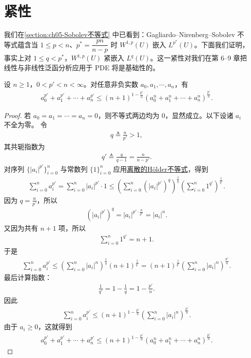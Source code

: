 \documentclass[../../main.tex]{subfiles}
\begin{document}
\section{紧性}\label{section:ch05-紧性}

我们在\cref{section:ch05-Sobolev不等式} 中已看到：Gagliardo--Nirenberg--Sobolev 不等式蕴含当 $1\leqslant p<n$、$p^{*}=\dfrac{pn}{n-p}$ 时 $W^{1,p}(U)$ 嵌入 $L^{p^{*}}(U)$。下面我们证明，事实上对 $1\leqslant q<p^{*}$，$W^{1,p}(U)$ 紧嵌入 $L^{q}(U)$。这一紧性对我们在第 6--9 章把线性与非线性泛函分析应用于 PDE 将是基础性的。

\begin{lemma}\label{lemma:有限维lp与ln范数}
设 $n\geqslant 1$，$0<p'<n<\infty$。对任意非负实数 $a_0,a_1,\cdots,a_n$，有
\begin{align*}
a_0^{p'}+a_1^{p'}+\cdots+a_n^{p'}
\leqslant (n+1)^{1-\frac{p'}{n}}
\left(a_0^{n}+a_1^{n}+\cdots+a_n^{n}\right)^{\frac{p'}{n}}.
\end{align*}
\end{lemma}
\begin{proof}
若 $a_0=a_1=\cdots=a_n=0$，则不等式两边均为 $0$，显然成立。以下设诸 $a_i$ 不全为零。
令
\begin{align*}
q\triangleq\frac{n}{p'}>1,
\end{align*}
其共轭指数为
\begin{align*}
q'\triangleq\frac{q}{q-1}=\frac{n}{n-p'}.
\end{align*}
对序列 $\{|a_i|^{p'}\}_{i=0}^{n}$ 与常数列 $\{1\}_{i=0}^{n}$ 应用\hyperref[Basis of Analytics-theorem:离散的Hölder不等式]{离散的Hölder不等式}，得到
\begin{align*}
\sum_{i=0}^{n} a_i^{p'}
=\sum_{i=0}^{n} |a_i|^{p'}\cdot 1\leqslant
\left(\sum_{i=0}^{n}\left(|a_i|^{p'}\right)^{q}\right)^{\frac{1}{q}}
\left(\sum_{i=0}^{n}1^{q'}\right)^{\frac{1}{q'}}.
\end{align*}
因为 $q=\frac{n}{p'}$，所以
\begin{align*}
\left(|a_i|^{p'}\right)^{q}
=|a_i|^{p'\cdot\frac{n}{p'}}
=|a_i|^{n}.
\end{align*}
又因为共有 $n+1$ 项，所以
\begin{align*}
\sum_{i=0}^{n}1^{q'}=n+1.
\end{align*}
于是
\begin{align*}
\sum_{i=0}^{n} a_i^{p'}
\leqslant
\left(\sum_{i=0}^{n}|a_i|^{n}\right)^{\frac{1}{q}}
(n+1)^{\frac{1}{q'}}=(n+1)^{\frac{1}{q'}}
\left(\sum_{i=0}^{n}|a_i|^{n}\right)^{\frac{p'}{n}}.
\end{align*}
最后计算指数：
\begin{align*}
\frac{1}{q'}=1-\frac{1}{q}=1-\frac{p'}{n}.
\end{align*}
因此
\begin{align*}
\sum_{i=0}^{n} a_i^{p'}
\leqslant (n+1)^{1-\frac{p'}{n}}
\left(\sum_{i=0}^{n}|a_i|^{n}\right)^{\frac{p'}{n}}.
\end{align*}
由于 $a_i\geqslant 0$，这就得到
\begin{align*}
a_0^{p'}+a_1^{p'}+\cdots+a_n^{p'}
\leqslant (n+1)^{1-\frac{p'}{n}}
\left(a_0^{n}+a_1^{n}+\cdots+a_n^{n}\right)^{\frac{p'}{n}}.
\end{align*}
\end{proof}
\end{document}
